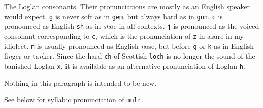 \documentclass[12pt]{article}
\begin{document}
The Loglan consonants.  Their pronunciations are mostly as an English speaker would expect.  {\tt g} is never soft as in
{\tt gem}, but always hard as in {\tt gun}.  {\tt c} is pronounced as English {\tt sh} as in {\em sh}oe in all contexts.  {\tt j} is pronounced as the voiced consonant corresponding to {\tt c}, which is the pronunciation of
{\tt z} in a{\em z}ure in my idiolect.  {\tt n} is usually pronounced as English {\em n}ose, but before
{\tt g} or {\tt k} as in English fi{\em n}ger or ta{\em n}ker.  Since the hard {\tt ch} of Scottish {\tt loch}
is no longer the sound of the banished Loglan {\tt x}, it is available as an alternative pronunciation of Loglan
{\tt h}.

Nothing in this paragraph is intended to be new.

See below for syllabic pronunciation of {\tt mnlr}.
\end{document}
